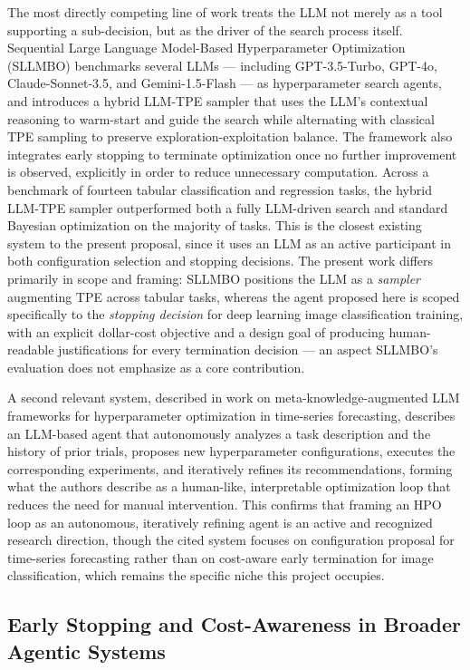 \documentclass[11pt]{article}
\begin{document}
The most directly competing line of work treats the LLM not merely as a tool supporting a sub-decision, but as the driver of the search process itself. Sequential Large Language Model-Based Hyperparameter Optimization (SLLMBO) benchmarks several LLMs --- including GPT-3.5-Turbo, GPT-4o, Claude-Sonnet-3.5, and Gemini-1.5-Flash --- as hyperparameter search agents, and introduces a hybrid LLM-TPE sampler that uses the LLM's contextual reasoning to warm-start and guide the search while alternating with classical TPE sampling to preserve exploration-exploitation balance. The framework also integrates early stopping to terminate optimization once no further improvement is observed, explicitly in order to reduce unnecessary computation. Across a benchmark of fourteen tabular classification and regression tasks, the hybrid LLM-TPE sampler outperformed both a fully LLM-driven search and standard Bayesian optimization on the majority of tasks. This is the closest existing system to the present proposal, since it uses an LLM as an active participant in both configuration selection and stopping decisions. The present work differs primarily in scope and framing: SLLMBO positions the LLM as a \emph{sampler} augmenting TPE across tabular tasks, whereas the agent proposed here is scoped specifically to the \emph{stopping decision} for deep learning image classification training, with an explicit dollar-cost objective and a design goal of producing human-readable justifications for every termination decision --- an aspect SLLMBO's evaluation does not emphasize as a core contribution.

A second relevant system, described in work on meta-knowledge-augmented LLM frameworks for hyperparameter optimization in time-series forecasting, describes an LLM-based agent that autonomously analyzes a task description and the history of prior trials, proposes new hyperparameter configurations, executes the corresponding experiments, and iteratively refines its recommendations, forming what the authors describe as a human-like, interpretable optimization loop that reduces the need for manual intervention. This confirms that framing an HPO loop as an autonomous, iteratively refining agent is an active and recognized research direction, though the cited system focuses on configuration proposal for time-series forecasting rather than on cost-aware early termination for image classification, which remains the specific niche this project occupies.

\subsection{Early Stopping and Cost-Awareness in Broader Agentic Systems}
\end{document}
